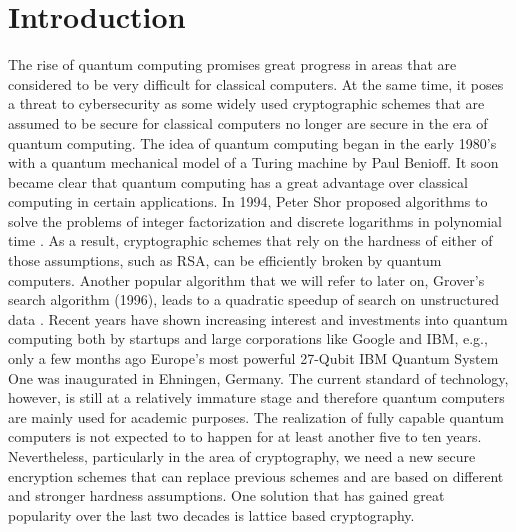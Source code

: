 \documentclass[
  a4paper,  %
  twoside,  %
  bibliography=totoc,
  headsepline,
  cleardoublepage=empty,
  parskip=half,
  draft=false
]{scrbook}
\begin{document}
\chapter{Introduction}\label{sec:intro}
The rise of quantum computing promises great progress in areas that are considered to be very difficult for classical computers. At the same time, it poses a threat to cybersecurity as some widely used cryptographic schemes that are assumed to be secure for classical computers no longer are secure in the era of quantum computing. The idea of quantum computing began in the early 1980's with a quantum mechanical model of a Turing machine by Paul Benioff. It soon became clear that quantum computing has a great advantage over classical computing in certain applications. In 1994, Peter Shor proposed algorithms to solve the problems of integer factorization and discrete logarithms in polynomial time \cite{Shor97}. As a result, cryptographic schemes that rely on the hardness of either of those assumptions, such as RSA, can be efficiently broken by quantum computers. Another popular algorithm that we will refer to later on, Grover's search algorithm (1996), leads to a quadratic speedup of search on unstructured data \cite{Gro96}.
Recent years have shown increasing interest and investments into quantum computing both by startups and large corporations like Google and IBM, e.g., only a few months ago Europe's most powerful 27-Qubit IBM Quantum System One was inaugurated in Ehningen, Germany. The current standard of technology, however, is still at a relatively immature stage and therefore quantum computers are mainly used for academic purposes. The realization of fully capable quantum computers is not expected to to happen for at least another five to ten years.
Nevertheless, particularly in the area of cryptography, we need a new secure encryption schemes that can replace previous schemes and are based on different and stronger hardness assumptions. One solution that has gained great popularity over the last two decades is lattice based cryptography.
\end{document}
